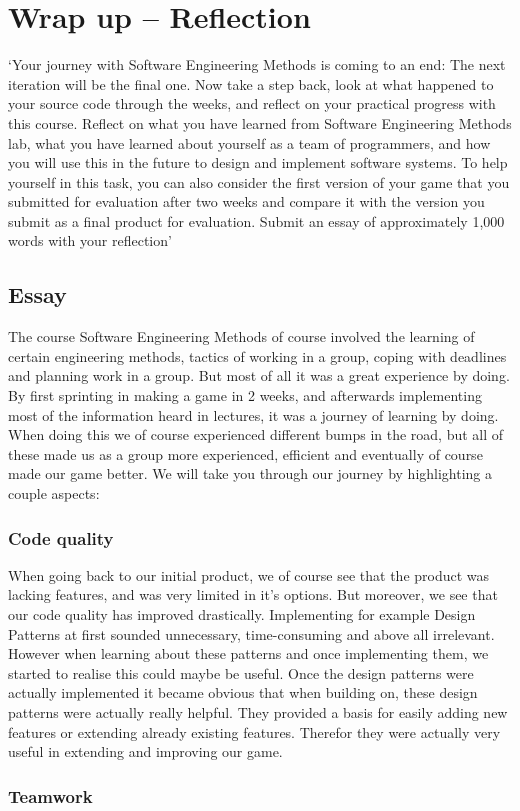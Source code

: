 \chapter{Wrap up – Reflection}

`Your journey with Software Engineering Methods is coming to an end: The next iteration will be the final
one. Now take a step back, look at what happened to your source code through the weeks, and reflect on
your practical progress with this course.
Reflect on what you have learned from Software Engineering Methods lab, what you have learned about
yourself as a team of programmers, and how you will use this in the future to design and implement
software systems. To help yourself in this task, you can also consider the first version of your game that
you submitted for evaluation after two weeks and compare it with the version you submit as a final product
for evaluation. Submit an essay of approximately 1,000 words with your reflection'

\section{Essay}
The course Software Engineering Methods of course involved the learning of certain engineering methods, tactics of working in a group, coping with deadlines and planning work in a group. But most of all it was a great experience by doing. By first sprinting in making a game in 2 weeks, and afterwards implementing most of the information heard in lectures, it was a journey of learning by doing. When doing this we of course experienced different bumps in the road, but all of these made us as a group more experienced, efficient and eventually of course made our game better. We will take you through our journey by highlighting a couple aspects:

\subsection{Code quality}
When going back to our initial product, we of course see that the product was lacking features, and was very limited in it's options. But moreover, we see that our code quality has improved drastically. Implementing for example Design Patterns at first sounded unnecessary, time-consuming and above all irrelevant. However when learning about these patterns and once implementing them, we started to realise this could maybe be useful. Once the design patterns were actually implemented it became obvious that when building on, these design patterns were actually really helpful. They provided a basis for easily adding new features or extending already existing features. Therefor they were actually very useful in extending and improving our game. 

\subsection{Teamwork}

